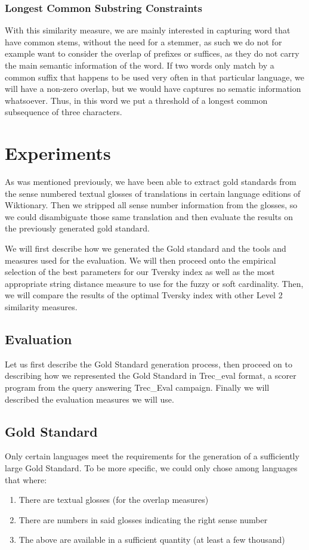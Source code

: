 \documentclass[10pt, a4paper]{article}
\begin{document}
\subsubsection{Longest Common Substring Constraints}
With this similarity measure, we are mainly interested in capturing word that have common stems, without the need for a stemmer, as such we do not for example want to consider the overlap of prefixes or suffices, as they do not carry the main semantic information of the word. If two words only match by a common suffix that happens to be used very often in that particular language, we will have a non-zero overlap, but we would have captures no sematic information whatsoever. Thus, in this word we put a threshold of a longest common subsequence of three characters.

\section{Experiments}
\label{sec:expe}
As was mentioned previously, we have been able to extract gold standards from the sense numbered textual glosses of translations in certain language editions of Wiktionary. Then we stripped all sense number information from the glosses, so we could disambiguate those same translation and then evaluate the results on the previously generated gold standard.

We will first describe how we generated the Gold standard and the tools and measures used for the evaluation. We will then proceed onto the empirical selection of the best parameters for our Tversky index as well as the most appropriate string distance measure to use for the fuzzy or soft cardinality. Then, we will compare the results of the optimal Tversky index with other Level 2 similarity measures.
 
\subsection{Evaluation}
Let us first describe the Gold Standard generation process, then proceed on to describing how we represented the Gold Standard in Trec\_eval format, a scorer program from the query answering Trec\_Eval campaign. Finally we will described the evaluation measures we will use. 
\subsection{Gold Standard}
Only certain languages meet the requirements for the generation of a sufficiently large Gold Standard. To be more specific, we could only chose among languages that where:
\begin{enumerate}
	\item There are textual glosses (for the overlap measures)
	\item There are numbers in said glosses indicating the right sense number
	\item The above are available in a sufficient quantity (at least a few thousand)
\end{enumerate}
\end{document}
